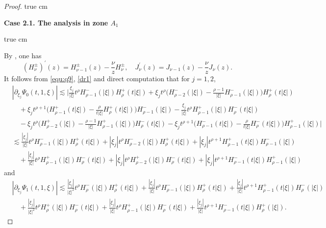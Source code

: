 \documentclass[11pt,twoside]{article}
\newcommand{\p}{\partial}
\newcommand{\f}{\frac}
\theoremstyle{plain}
\theoremstyle{definition}
\theoremstyle{remark}
\numberwithin{equation}{section}
\begin{document}
\begin{proof}
 true cm

{\bf Case 2.1.  The analysis  in zone $A_1$}

 true cm

By \cite[Section 10]{OLBC}, one has
\begin{equation}\label{dr1}
(H_\nu^{\pm})^{\prime}(z)=H_{\nu-1}^{\pm}(z)-\frac{\nu}{z}H_\nu^{\pm},\quad
J_\nu^{\prime}(z)=J_{\nu-1}(z)-\frac{\nu}{z}J_\nu(z).
\end{equation}
It follows from \eqref{equ:q9}, \eqref{dr1} and direct computation that for $j=1,2$,
\begin{equation}\label{equ:q51}
 \begin{aligned}
& |\p_{\xi_j}\Psi_0(t, 1, \xi)|
\lesssim |\frac{\xi_j}{|\xi|} t^\rho H_{\rho-1}^{-}(|\xi|) H_\rho^{+}(t|\xi|)+\xi_j t^\rho\big(H_{\rho-2}^{-}(|\xi|)-\frac{\rho-1}{|\xi|} H_{\rho-1}^{-}(|\xi|)\big) H_\rho^{+}(t|\xi|) \\
&\quad +\xi_j t^{\rho+1}\big(H_{\rho-1}^{+}(t|\xi|)-\frac{\rho}{t|\xi|} H_\rho^{+}(t|\xi|)\big) H_{\rho-1}^{-}(|\xi|)
-\frac{\xi_j}{|\xi|} t^\rho H_{\rho-1}^{+}(|\xi|) H_\rho^{-}(t|\xi|)\\
&\quad -\xi_j t^\rho\big(H_{\rho-2}^{+}(|\xi|)-\frac{\rho-1}{|\xi|} H_{\rho-1}^{+}(|\xi|)\big) H_\rho^{-}(t|\xi|)-\xi_j t^{\rho+1}\big(H_{\rho-1}^{-}(t|\xi|)-\frac{\rho}{t|\xi|} H_\rho^{-}(t|\xi|)\big) H_{\rho-1}^{+}(|\xi|)|\\
& \lesssim \frac{|\xi_j|}{|\xi|} t^\rho H_{\rho-1}^{-}(|\xi|) H_\rho^{+}(t|\xi|)+|\xi_j| t^\rho H_{\rho-2}^{-}(|\xi|) H_\rho^{+}(t|\xi|)+|\xi_j| t^{\rho+1} H_{\rho-1}^{+}(t|\xi|) H_{\rho-1}^{-}(|\xi|) \\
&\quad +\frac{|\xi_j|}{|\xi|} t^\rho H_{\rho-1}^{+}(|\xi|) H_\rho^{-}(t|\xi|)+|\xi_j| t^\rho H_{\rho-2}^{+}(|\xi|) H_\rho^{-}(t|\xi|)+|\xi_j| t^{\rho+1} H_{\rho-1}^{-}(t|\xi|) H_{\rho-1}^{+}(|\xi|)
\end{aligned}
\end{equation}
and
\begin{equation}\label{equ:q52}
\begin{aligned}
&|\p_{\xi_j}\Psi_1(t, 1, \xi)|
\lesssim \frac{|\xi_j|}{|\xi|^2} t^\rho H_{\rho}^{-}(|\xi|) H_\rho^{+}(t|\xi|)+\f{|\xi_j|}{|\xi|} t^\rho H_{\rho-1}^{-}(|\xi|) H_\rho^{+}(t|\xi|)+\f{|\xi_j|}{|\xi|} t^{\rho+1} H_{\rho-1}^{+}(t|\xi|) H_{\rho}^{-}(|\xi|) \\
&\quad +\frac{|\xi_j|}{|\xi|^2} t^\rho H_{\rho}^{+}(|\xi|) H_\rho^{-}(t|\xi|)+\f{|\xi_j|}{|\xi|} t^\rho H_{\rho-1}^{+}(|\xi|) H_\rho^{-}(t|\xi|)+\f{|\xi_j|}{|\xi|} t^{\rho+1} H_{\rho-1}^{-}(t|\xi|) H_{\rho}^{+}(|\xi|).

\end{aligned}
\end{equation}
\end{proof}
\end{document}
